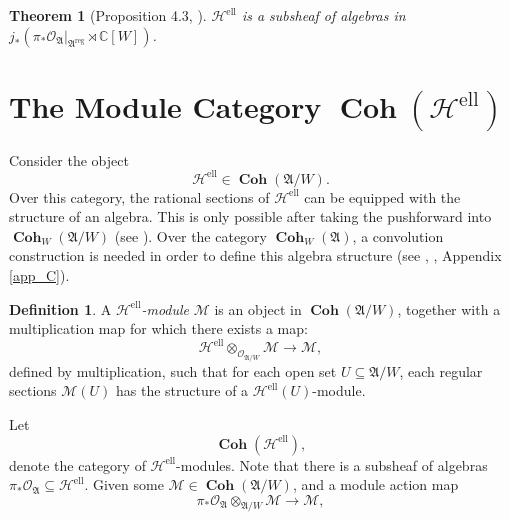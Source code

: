 \documentclass[a4paper]{report}
\newtheorem{theorem}{Theorem}
\theoremstyle{theorem}
\theoremstyle{definition}
\newtheorem{definition}{Definition}
\theoremstyle{remark}
\theoremstyle{proposition}
\theoremstyle{conjecture}
\theoremstyle{lemma}
\theoremstyle{corollary}
\theoremstyle{exercise}
\theoremstyle{example}
\newcommand{\C}{\mathbb{C}}
\newcommand{\mcal}{\mathcal}
\newcommand{\on}{\operatorname}
\newcommand{\coh}{\on{\mathbf{Coh}}}
\begin{document}
  \begin{theorem}[Proposition 4.3, \cite{gkv95}]
      $\mcal{H}^{\on{ell}}$ is a subsheaf of algebras in $j_\ast(\pi_\ast\mcal{O}_{\mathfrak{A}}\vert_{\mathfrak{A}^{\on{reg}}} \rtimes \C[W])$. 
  \end{theorem}
  
  
  \section{The Module Category $\coh(\mcal{H}^{\on{ell}})$}
  
  Consider the object 
  $$\mcal{H}^{\on{ell}} \in \coh(\mathfrak{A}/W).$$
  Over this category, the rational sections of  $\mcal{H}^{\on{ell}}$ can be equipped with the 
  structure of an algebra. This is only possible after taking the pushforward into $\coh_W(\mathfrak{A}/W)$
  (see \cite[\S 4]{ZZ21}).
  Over the category $\coh_W(\mathfrak{A})$, a convolution construction is needed in order to define this 
  algebra structure (see \cite[\S 5]{ZZ21}, \cite[\S 2]{ZZ24}, Appendix \ref{app_C}).
  \begin{definition}
      A \emph{$\mcal{H}^{\on{ell}}$-module} $\mcal{M}$ is an object in
      $\coh(\mathfrak{A}/W)$, together with a multiplication map for which there exists a map:
      $$\mcal{H}^{\on{ell}} \otimes_{\mcal{O}_{\mathfrak{A}/W}} \mcal{M} \longrightarrow \mcal{M},$$
      defined by multiplication, such that for each open set 
      $U \subseteq \mathfrak{A}/W$, each regular sections $\mcal{M}(U)$ has the structure of a $\mcal{H}^{\on{ell}}(U)$-module.
  \end{definition}
  Let $$\coh(\mcal{H}^{\on{ell}}),$$ 
  denote the category of $\mcal{H}^{\on{ell}}$-modules. Note that there is a subsheaf of algebras 
  $\pi_\ast\mcal{O}_{\mathfrak{A}} \subseteq \mcal{H}^{\on{ell}}$. Given some $\mcal{M} \in \coh(\mathfrak{A}/W)$,
  and a module action map $$\pi_\ast\mcal{O}_{\mathfrak{A}} \otimes_{\mathfrak{A}/W} \mcal{M} \longrightarrow \mcal{M},$$ 
\end{document}
